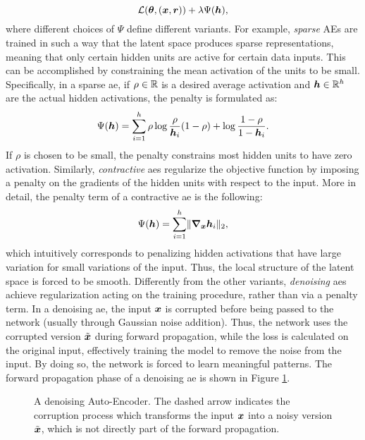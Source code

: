 $$\Loss(\Param, (\Vector{x}, \Vector{r})) + \lambda \Psi(\Vector{h}),$$
where different choices of $\Psi$ define different variants. For example, \emph{sparse} AEs
are trained in such a way that the latent space produces sparse representations, meaning that only certain hidden units are active for certain data inputs. This can be accomplished by constraining the mean activation of the units to be small. Specifically, in a sparse \gls{ae}, if $\rho \in \mathbb{R}$ is a desired average activation and $\Vector{h} \in \Real^h$ are the actual hidden activations, the penalty is formulated as:
$$\Psi(\Vector{h}) = \sum_{i=1}^h \rho \log \frac{\rho}{\Vector{h}_i} (1 - \rho) + \log \frac{1-\rho}{1-\Vector{h}_i}.$$
If $\rho$ is chosen to be small, the penalty constrains most hidden units to have zero activation. Similarly, \emph{contractive} \glspl{ae} \citep{rifai2011contractiveautoenc} regularize the objective function by imposing a penalty on the gradients of the hidden units with respect to the input. More in detail, the penalty term of a contractive \gls{ae} is the following:
$$\Psi(\Vector{h}) = \sum_{i=1}^h\norm{\grad_{\Vector{x}}\Vector{h}_i}_2,$$
which intuitively corresponds to penalizing hidden activations that have large variation for small variations of the input. Thus, the local structure of the latent space is forced to be smooth. Differently from the other variants, \emph{denoising} \glspl{ae} \citep{vincent2010denoisingautoenc} achieve regularization acting on the training procedure, rather than via a penalty term. In a denoising \gls{ae}, the input $\Vector{x}$ is corrupted before being passed to the network (usually through Gaussian noise addition). Thus, the network uses the corrupted version $\tilde{\Vector{x}}$ during forward propagation, while the loss is calculated on the original input, effectively training the model to remove the noise from the input. By doing so, the network is forced to learn meaningful patterns. The forward propagation phase of a denoising \gls{ae} is shown in Figure \ref{fig:denoising-ae}.
\begin{figure*}[h!]
    \centering
    \resizebox{.6\textwidth}{!}{}
    \caption{A denoising Auto-Encoder. The dashed arrow indicates the corruption process which transforms the input $\Vector{x}$ into a noisy version $\tilde{\Vector{x}}$, which is not directly part of the forward propagation.}
    \label{fig:denoising-ae}
\end{figure*}

